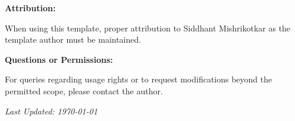 \vspace{1.5\baselineskip}

\noindent \textbf{Attribution:}

When using this template, proper attribution to Siddhant Mishrikotkar as the template author must be maintained.

\vspace{2\baselineskip}

\noindent \textbf{Questions or Permissions:}

For queries regarding usage rights or to request modifications beyond the permitted scope, please contact the author.

\vspace{2\baselineskip}

\noindent \textit{Last Updated: \today}

\clearpage
